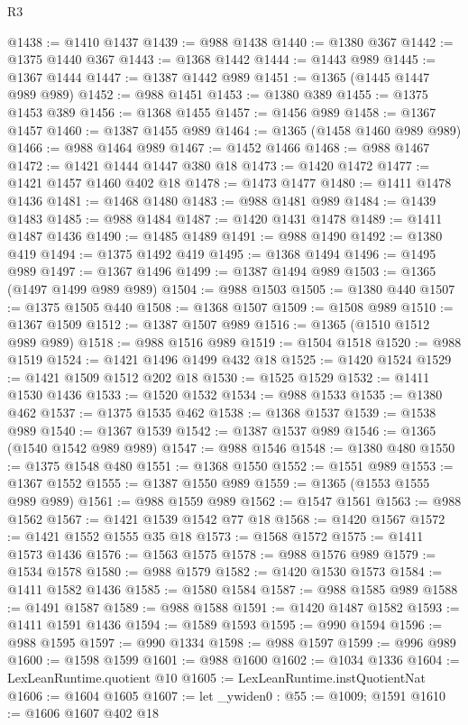 \begin{lexlean}{R3}
\begin{coremodule}
@1438 := @1410 @1437
@1439 := @988 @1438
@1440 := @1380 @367
@1442 := @1375 @1440 @367
@1443 := @1368 @1442
@1444 := @1443 @989
@1445 := @1367 @1444
@1447 := @1387 @1442 @989
@1451 := @1365 (@1445 @1447 @989 @989)
@1452 := @988 @1451
@1453 := @1380 @389
@1455 := @1375 @1453 @389
@1456 := @1368 @1455
@1457 := @1456 @989
@1458 := @1367 @1457
@1460 := @1387 @1455 @989
@1464 := @1365 (@1458 @1460 @989 @989)
@1466 := @988 @1464 @989
@1467 := @1452 @1466
@1468 := @988 @1467
@1472 := @1421 @1444 @1447 @380 @18
@1473 := @1420 @1472
@1477 := @1421 @1457 @1460 @402 @18
@1478 := @1473 @1477
@1480 := @1411 @1478 @1436
@1481 := @1468 @1480
@1483 := @988 @1481 @989
@1484 := @1439 @1483
@1485 := @988 @1484
@1487 := @1420 @1431 @1478
@1489 := @1411 @1487 @1436
@1490 := @1485 @1489
@1491 := @988 @1490
@1492 := @1380 @419
@1494 := @1375 @1492 @419
@1495 := @1368 @1494
@1496 := @1495 @989
@1497 := @1367 @1496
@1499 := @1387 @1494 @989
@1503 := @1365 (@1497 @1499 @989 @989)
@1504 := @988 @1503
@1505 := @1380 @440
@1507 := @1375 @1505 @440
@1508 := @1368 @1507
@1509 := @1508 @989
@1510 := @1367 @1509
@1512 := @1387 @1507 @989
@1516 := @1365 (@1510 @1512 @989 @989)
@1518 := @988 @1516 @989
@1519 := @1504 @1518
@1520 := @988 @1519
@1524 := @1421 @1496 @1499 @432 @18
@1525 := @1420 @1524
@1529 := @1421 @1509 @1512 @202 @18
@1530 := @1525 @1529
@1532 := @1411 @1530 @1436
@1533 := @1520 @1532
@1534 := @988 @1533
@1535 := @1380 @462
@1537 := @1375 @1535 @462
@1538 := @1368 @1537
@1539 := @1538 @989
@1540 := @1367 @1539
@1542 := @1387 @1537 @989
@1546 := @1365 (@1540 @1542 @989 @989)
@1547 := @988 @1546
@1548 := @1380 @480
@1550 := @1375 @1548 @480
@1551 := @1368 @1550
@1552 := @1551 @989
@1553 := @1367 @1552
@1555 := @1387 @1550 @989
@1559 := @1365 (@1553 @1555 @989 @989)
@1561 := @988 @1559 @989
@1562 := @1547 @1561
@1563 := @988 @1562
@1567 := @1421 @1539 @1542 @77 @18
@1568 := @1420 @1567
@1572 := @1421 @1552 @1555 @35 @18
@1573 := @1568 @1572
@1575 := @1411 @1573 @1436
@1576 := @1563 @1575
@1578 := @988 @1576 @989
@1579 := @1534 @1578
@1580 := @988 @1579
@1582 := @1420 @1530 @1573
@1584 := @1411 @1582 @1436
@1585 := @1580 @1584
@1587 := @988 @1585 @989
@1588 := @1491 @1587
@1589 := @988 @1588
@1591 := @1420 @1487 @1582
@1593 := @1411 @1591 @1436
@1594 := @1589 @1593
@1595 := @990 @1594
@1596 := @988 @1595
@1597 := @990 @1334
@1598 := @988 @1597
@1599 := @996 @989
@1600 := @1598 @1599
@1601 := @988 @1600
@1602 := @1034 @1336
@1604 := LexLeanRuntime.quotient @10
@1605 := LexLeanRuntime.instQuotientNat
@1606 := @1604 @1605
@1607 := let _ywiden0 : @55 := @1009; @1591
@1610 := @1606 @1607 @402 @18

\end{coremodule}
\end{lexlean}
